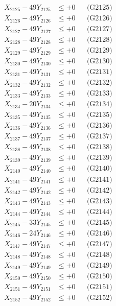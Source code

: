 \documentclass[a4paper,10pt]{article}
\begin{document}
{\begin{align}
X_{2125} - 49Y_{2125} &\leq +0 && \text{(G2125)} \\
X_{2126} - 49Y_{2126} &\leq +0 && \text{(G2126)} \\
X_{2127} - 49Y_{2127} &\leq +0 && \text{(G2127)} \\
X_{2128} - 49Y_{2128} &\leq +0 && \text{(G2128)} \\
X_{2129} - 49Y_{2129} &\leq +0 && \text{(G2129)} \\
X_{2130} - 49Y_{2130} &\leq +0 && \text{(G2130)} \\
\allowbreak
X_{2131} - 49Y_{2131} &\leq +0 && \text{(G2131)} \\
X_{2132} - 49Y_{2132} &\leq +0 && \text{(G2132)} \\
X_{2133} - 49Y_{2133} &\leq +0 && \text{(G2133)} \\
X_{2134} - 20Y_{2134} &\leq +0 && \text{(G2134)} \\
X_{2135} - 49Y_{2135} &\leq +0 && \text{(G2135)} \\
X_{2136} - 49Y_{2136} &\leq +0 && \text{(G2136)} \\
X_{2137} - 49Y_{2137} &\leq +0 && \text{(G2137)} \\
X_{2138} - 49Y_{2138} &\leq +0 && \text{(G2138)} \\
X_{2139} - 49Y_{2139} &\leq +0 && \text{(G2139)} \\
X_{2140} - 49Y_{2140} &\leq +0 && \text{(G2140)} \\
\allowbreak
X_{2141} - 49Y_{2141} &\leq +0 && \text{(G2141)} \\
X_{2142} - 49Y_{2142} &\leq +0 && \text{(G2142)} \\
X_{2143} - 49Y_{2143} &\leq +0 && \text{(G2143)} \\
X_{2144} - 49Y_{2144} &\leq +0 && \text{(G2144)} \\
X_{2145} - 33Y_{2145} &\leq +0 && \text{(G2145)} \\
X_{2146} - 24Y_{2146} &\leq +0 && \text{(G2146)} \\
X_{2147} - 49Y_{2147} &\leq +0 && \text{(G2147)} \\
X_{2148} - 49Y_{2148} &\leq +0 && \text{(G2148)} \\
X_{2149} - 49Y_{2149} &\leq +0 && \text{(G2149)} \\
X_{2150} - 49Y_{2150} &\leq +0 && \text{(G2150)} \\
\allowbreak
X_{2151} - 49Y_{2151} &\leq +0 && \text{(G2151)} \\
X_{2152} - 49Y_{2152} &\leq +0 && \text{(G2152)} \\

\end{align}}
\end{document}
